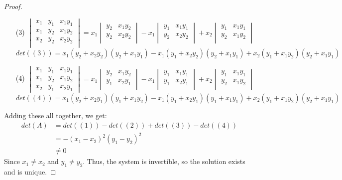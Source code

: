\documentclass[12pt]{article}
\begin{document}
\begin{proof}
\begin{itemize}
\item[(3)] $\begin{vmatrix}
x_1 & y_1 & x_1y_1 \\
x_1 & y_2 & x_1y_2 \\
x_2 & y_2 & x_2y_2 \\
\end{vmatrix} = x_1\begin{vmatrix}
y_2 & x_1y_2 \\
y_2 & x_2y_2 \\
\end{vmatrix} - x_1\begin{vmatrix}
y_1 & x_1y_1 \\
y_2 & x_2y_2 \\
\end{vmatrix} + x_2\begin{vmatrix}
y_1 & x_1y_1 \\
y_2 & x_1y_2 \\
\end{vmatrix}$\\
$det((3)) = x_1(y_2+x_2y_2)(y_2+x_1y_1) - x_1(y_1+x_2y_2)(y_2+x_1y_1) + x_2(y_1+x_1y_2)(y_2+x_1y_1)$

\item[(4)] $\begin{vmatrix}
x_1 & y_1 & x_1y_1 \\
x_1 & y_2 & x_1y_2 \\
x_2 & y_1 & x_2y_1
\end{vmatrix} = x_1\begin{vmatrix}
y_2 & x_1y_2 \\
y_1 & x_2y_1 \\
\end{vmatrix} - x_1\begin{vmatrix}
y_1 & x_1y_1 \\
y_1 & x_2y_1 \\
\end{vmatrix} + x_2\begin{vmatrix}
y_1 & x_1y_1 \\
y_2 & x_1y_2 \\
\end{vmatrix}$\\
$det((4)) = x_1(y_2+x_2y_1)(y_1+x_1y_2) - x_1(y_1+x_2y_1)(y_1+x_1y_1) + x_2(y_1+x_1y_2)(y_2+x_1y_1)$

\end{itemize}

Adding these all together, we get:
\begin{align*}
det(A) & = det((1)) - det((2)) + det((3)) - det((4)) \\
& = -(x_1 - x_2)^2(y_1 - y_2)^2 \\
& \neq 0
\end{align*}
Since $x_1 \neq x_2$ and $y_1 \neq y_2$.  Thus, the system is invertible, so the solution exists and is unique.
\end{proof} \text{ }\\
\end{document}
